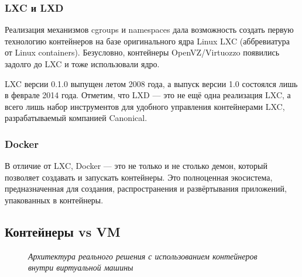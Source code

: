 \documentclass[14pt, a4paper]{article}
\begin{document}
    \subsubsection*{\textbf{LXC и LXD}}

Реализация механизмов cgroups и namespaces дала возможность создать первую технологию
контейнеров на базе оригинального ядра Linux LXC (аббревиатура от Linux containers). Безусловно,
контейнеры OpenVZ/Virtuozzo появились задолго до LXC и тоже использовали ядро.


LXC версии 0.1.0 выпущен летом 2008 года, а выпуск версии 1.0 состоялся лишь в феврале 2014
года. Отметим, что LXD — это не ещё одна реализация LXC, а всего лишь набор инструментов для
удобного управления контейнерами LXC, разрабатываемый компанией Canonical.\\


\subsubsection*{\textbf{Docker}}

В отличие от LXC, Docker — это не только и не столько демон, который позволяет создавать и
запускать контейнеры. Это полноценная экосистема, предназначенная для создания,
распространения и развёртывания приложений, упакованных в контейнеры.\\


\subsection*{Контейнеры vs VM}

\begin{figure}[h]%
    \centering
    \caption*{\textit{Архитектура реального решения с использованием контейнеров внутри виртуальной машины}}
    \label{framework} %
\end{figure}
\end{document}
